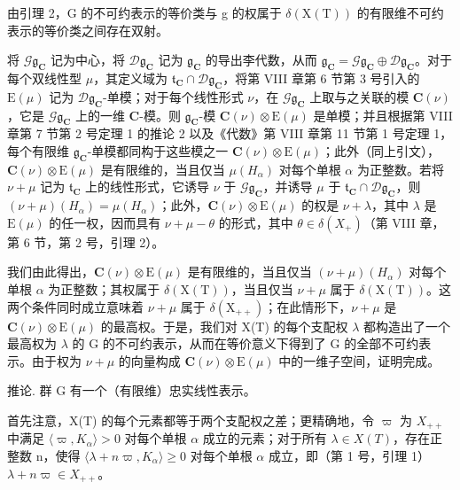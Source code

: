 由引理 2，G 的不可约表示的等价类与 g 的权属于 \(\delta(\mathrm{X}(\mathrm{T}))\) 的有限维不可约表示的等价类之间存在双射。

将 \(\mathcal{G}\mathfrak{g}_{\mathbf{C}}\) 记为中心，将 \(\mathcal{D}\mathfrak{g}_{\mathbf{C}}\) 记为 \(\mathfrak{g}_{\mathbf{C}}\) 的导出李代数，从而 \(\mathfrak{g}_{\mathbf{C}} = \mathcal{G}\mathfrak{g}_{\mathbf{C}} \oplus \mathcal{D}\mathfrak{g}_{\mathbf{C}}\)。对于每个双线性型 \(\mu\)，其定义域为 \(\mathfrak{t}_{\mathbf{C}} \cap \mathcal{D}\mathfrak{g}_{\mathbf{C}}\)，将第 VIII 章第 6 节第 3 号引入的 \(\mathrm{E}(\mu)\) 记为 \(\mathcal{D}\mathfrak{g}_{\mathbf{C}}\)-单模；对于每个线性形式 \(\nu\)，在 \(\mathcal{G}\mathfrak{g}_{\mathbf{C}}\) 上取与之关联的模 \(\mathbf{C}(\nu)\)，它是 \(\mathcal{G}\mathfrak{g}_{\mathbf{C}}\) 上的一维 \(\mathbf{C}\)-模。则 \(\mathfrak{g}_{\mathbf{C}}\)-模 \(\mathbf{C}(\nu) \otimes \mathrm{E}(\mu)\) 是单模；并且根据第 VIII 章第 7 节第 2 号定理 1 的推论 2 以及《代数》第 VIII 章第 11 节第 1 号定理 1，每个有限维 \(\mathfrak{g}_{\mathbf{C}}\)-单模都同构于这些模之一 \(\mathbf{C}(\nu) \otimes \mathrm{E}(\mu)\)；此外（同上引文），\(\mathbf{C}(\nu) \otimes \mathrm{E}(\mu)\) 是有限维的，当且仅当 \(\mu(H_{\alpha})\) 对每个单根 \(\alpha\) 为正整数。若将 \(\nu + \mu\) 记为 \(\mathfrak{t}_{\mathbf{C}}\) 上的线性形式，它诱导 \(\nu\) 于 \(\mathcal{G}\mathfrak{g}_{\mathbf{C}}\)，并诱导 \(\mu\) 于 \(\mathfrak{t}_{\mathbf{C}} \cap \mathcal{D}\mathfrak{g}_{\mathbf{C}}\)，则 \((\nu + \mu)(H_{\alpha}) = \mu(H_{\alpha})\)；此外，\(\mathbf{C}(\nu) \otimes \mathrm{E}(\mu)\) 的权是 \(\nu + \lambda\)，其中 \(\lambda\) 是 \(\mathrm{E}(\mu)\) 的任一权，因而具有 \(\nu + \mu - \theta\) 的形式，其中 \(\theta \in \delta(X_{+})\)（第 VIII 章，第 6 节，第 2 号，引理 2）。

我们由此得出，\(\mathbf{C}(\nu)\otimes\mathrm{E}(\mu)\) 是有限维的，当且仅当 \((\nu+\mu)(H_{\alpha})\) 对每个单根 \(\alpha\) 为正整数；其权属于 \(\delta(\mathrm{X}(\mathrm{T}))\)，当且仅当 \(\nu+\mu\) 属于 \(\delta(\mathrm{X}(\mathrm{T}))\)。这两个条件同时成立意味着 \(\nu+\mu\) 属于 \(\delta(\mathrm{X}_{++})\)；在此情形下，\(\nu+\mu\) 是 \(\mathbf{C}(\nu)\otimes\mathrm{E}(\mu)\) 的最高权。于是，我们对 X(T) 的每个支配权 \(\lambda\) 都构造出了一个最高权为 \(\lambda\) 的 G 的不可约表示，从而在等价意义下得到了 G 的全部不可约表示。由于权为 \(\nu+\mu\) 的向量构成 \(\mathbf{C}(\nu)\otimes\mathrm{E}(\mu)\) 中的一维子空间，证明完成。

推论. 群 G 有一个（有限维）忠实线性表示。

首先注意，X(T) 的每个元素都等于两个支配权之差；更精确地，令 \(\varpi\) 为 \(X_{++}\) 中满足 \(\langle\varpi,K_{\alpha}\rangle>0\) 对每个单根 \(\alpha\) 成立的元素；对于所有 \(\lambda\in X(T)\)，存在正整数 n，使得 \(\langle\lambda+n\varpi,K_{\alpha}\rangle\geq0\) 对每个单根 \(\alpha\) 成立，即（第 1 号，引理 1）\(\lambda+n\varpi\in X_{++}\)。

